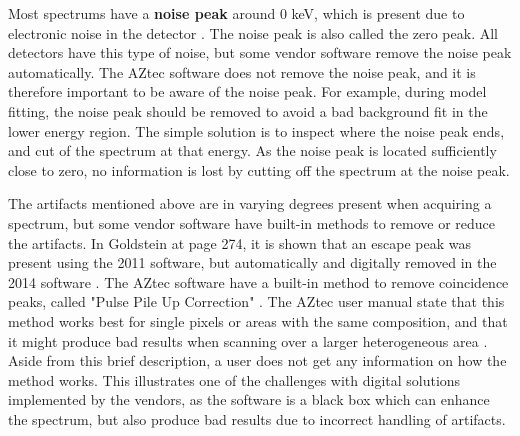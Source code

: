 



Most spectrums have a \textbf{noise peak} around $0$ keV, which is present due to electronic noise in the detector \cite{aztec_manual}.
The noise peak is also called the zero peak.
All detectors have this type of noise, but some vendor software remove the noise peak automatically.
The AZtec software does not remove the noise peak, and it is therefore important to be aware of the noise peak.
For example, during model fitting, the noise peak should be removed to avoid a bad background fit in the lower energy region.
The simple solution is to inspect where the noise peak ends, and cut of the spectrum at that energy.
As the noise peak is located sufficiently close to zero, no information is lost by cutting off the spectrum at the noise peak.



The artifacts mentioned above are in varying degrees present when acquiring a spectrum, but some vendor software have built-in methods to remove or reduce the artifacts.
In Goldstein at page 274, it is shown that an escape peak was present using the 2011 software, but automatically and digitally removed in the 2014 software \cite[Fig. 18.7]{goldstein_scanning_2018}.
The AZtec software have a built-in method to remove coincidence peaks, called "Pulse Pile Up Correction" \cite{aztec_manual}.
The AZtec user manual state that this method works best for single pixels or areas with the same composition, and that it might produce bad results when scanning over a larger heterogeneous area \cite[p. 99]{aztec_manual}.
Aside from this brief description, a user does not get any information on how the method works.
This illustrates one of the challenges with digital solutions implemented by the vendors, as the software is a black box which can enhance the spectrum, but also produce bad results due to incorrect handling of artifacts. %


